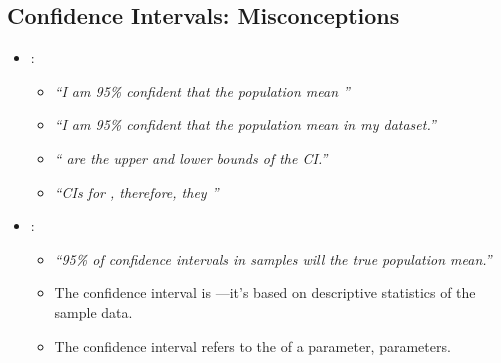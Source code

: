 \begin{itemize}
  \subsection{Confidence Intervals: Misconceptions}
  \begin{itemize}
    \item {}:
      \begin{itemize}
        \item \textit{``I am 95\% confident that the population mean ''}
        \item \textit{``I am 95\% confident that the population mean  in my dataset.''}
        \item \textit{`` are  the upper and lower bounds of the CI.''}
        \item \textit{``CIs for , therefore, they ''}
      \end{itemize}
    \item {}:
      \begin{itemize}
        \item \textit{``95\% of confidence intervals in  samples will  the true population mean.''}
        \item The confidence interval is ---it's based on descriptive statistics of the sample data.
        \item The confidence interval refers to the  of a parameter,  parameters.
      \end{itemize}
  \end{itemize}
  
  
\end{itemize}
